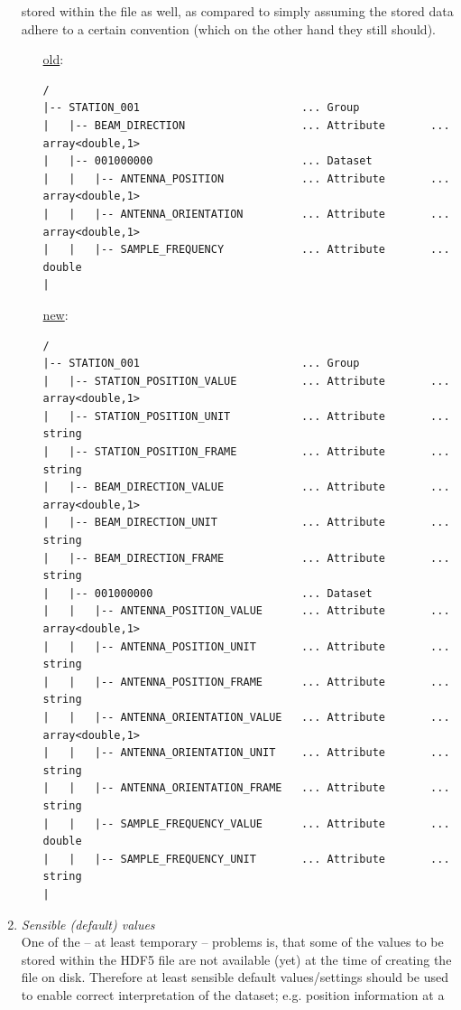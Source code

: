 \documentclass[a4paper,10pt,bibtotoc]{scrartcl}
\begin{document}
\begin{enumerate}
    stored within the file as well, as compared to simply assuming the stored
    data adhere to a certain convention (which on the other hand they still
    should).
  \begin{itemize}
  \item[\underline{old}:]
    {\small
\begin{verbatim}
/
|-- STATION_001                         ... Group
|   |-- BEAM_DIRECTION                  ... Attribute       ... array<double,1>
|   |-- 001000000                       ... Dataset
|   |   |-- ANTENNA_POSITION            ... Attribute       ... array<double,1>
|   |   |-- ANTENNA_ORIENTATION         ... Attribute       ... array<double,1>
|   |   |-- SAMPLE_FREQUENCY            ... Attribute       ... double
|
\end{verbatim}}
  \item[\underline{new}:]
    {\small
\begin{verbatim}
/
|-- STATION_001                         ... Group
|   |-- STATION_POSITION_VALUE          ... Attribute       ... array<double,1>
|   |-- STATION_POSITION_UNIT           ... Attribute       ... string
|   |-- STATION_POSITION_FRAME          ... Attribute       ... string
|   |-- BEAM_DIRECTION_VALUE            ... Attribute       ... array<double,1>
|   |-- BEAM_DIRECTION_UNIT             ... Attribute       ... string
|   |-- BEAM_DIRECTION_FRAME            ... Attribute       ... string
|   |-- 001000000                       ... Dataset
|   |   |-- ANTENNA_POSITION_VALUE      ... Attribute       ... array<double,1>
|   |   |-- ANTENNA_POSITION_UNIT       ... Attribute       ... string
|   |   |-- ANTENNA_POSITION_FRAME      ... Attribute       ... string
|   |   |-- ANTENNA_ORIENTATION_VALUE   ... Attribute       ... array<double,1>
|   |   |-- ANTENNA_ORIENTATION_UNIT    ... Attribute       ... string
|   |   |-- ANTENNA_ORIENTATION_FRAME   ... Attribute       ... string
|   |   |-- SAMPLE_FREQUENCY_VALUE      ... Attribute       ... double
|   |   |-- SAMPLE_FREQUENCY_UNIT       ... Attribute       ... string
|
\end{verbatim}}
  \end{itemize}
\item \textit{Sensible (default) values} \\
  One of the -- at least temporary -- problems is, that some of the values to be
  stored within the HDF5 file are not available (yet) at the time of creating the
  file on disk. Therefore at least sensible default values/settings should be used
  to enable correct interpretation of the dataset; e.g. position information at a

\end{enumerate}
\end{document}
